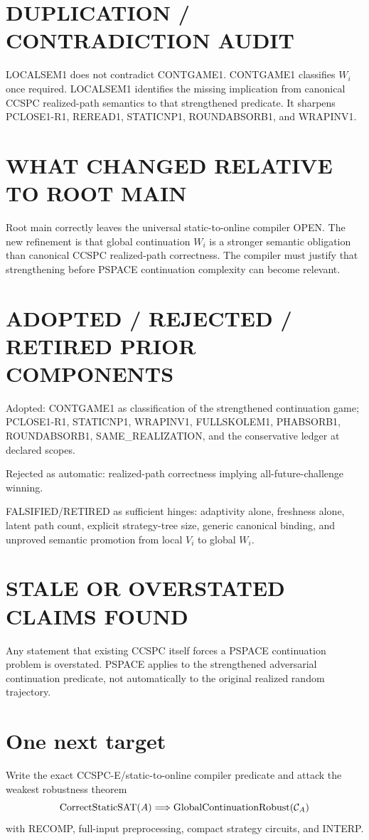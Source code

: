 \documentclass[11pt]{article}
\begin{document}
\section*{DUPLICATION / CONTRADICTION AUDIT}
LOCALSEM1 does not contradict CONTGAME1. CONTGAME1 classifies \(W_i\) once required. LOCALSEM1 identifies the missing implication from canonical CCSPC realized-path semantics to that strengthened predicate. It sharpens PCLOSE1-R1, REREAD1, STATICNP1, ROUNDABSORB1, and WRAPINV1.

\section*{WHAT CHANGED RELATIVE TO ROOT MAIN}
Root main correctly leaves the universal static-to-online compiler OPEN. The new refinement is that global continuation \(W_i\) is a stronger semantic obligation than canonical CCSPC realized-path correctness. The compiler must justify that strengthening before PSPACE continuation complexity can become relevant.

\section*{ADOPTED / REJECTED / RETIRED PRIOR COMPONENTS}
Adopted: CONTGAME1 as classification of the strengthened continuation game; PCLOSE1-R1, STATICNP1, WRAPINV1, FULLSKOLEM1, PHABSORB1, ROUNDABSORB1, SAME\_REALIZATION, and the conservative ledger at declared scopes.

Rejected as automatic: realized-path correctness implying all-future-challenge winning.

FALSIFIED/RETIRED as sufficient hinges: adaptivity alone, freshness alone, latent path count, explicit strategy-tree size, generic canonical binding, and unproved semantic promotion from local \(V_i\) to global \(W_i\).

\section*{STALE OR OVERSTATED CLAIMS FOUND}
Any statement that existing CCSPC itself forces a PSPACE continuation problem is overstated. PSPACE applies to the strengthened adversarial continuation predicate, not automatically to the original realized random trajectory.

\section*{One next target}
Write the exact CCSPC-E/static-to-online compiler predicate and attack the weakest robustness theorem
\[
\operatorname{CorrectStaticSAT}(A)\Longrightarrow
\operatorname{GlobalContinuationRobust}({\cal C}_A)
\]
with RECOMP, full-input preprocessing, compact strategy circuits, and INTERP.
\end{document}
